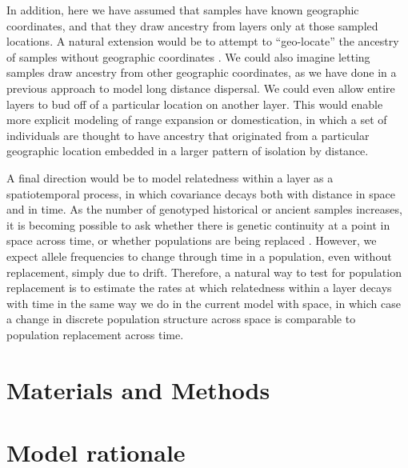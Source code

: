 \documentclass[10pt,letterpaper]{article}
\begin{document}
In addition, here we have assumed that samples have known geographic coordinates, 
and that they draw ancestry from layers only at those sampled locations. 
A natural extension would be to attempt to ``geo-locate'' 
the ancestry of samples without geographic coordinates \cite{Wasser2004}. 
We could also imagine letting samples draw ancestry from other geographic coordinates, 
as we have done in a previous approach \cite{spacemix} to model long distance dispersal. 
We could even allow entire layers to bud off of a particular location on another layer. 
This would enable more explicit modeling of range expansion or domestication, 
in which a set of individuals are thought to have ancestry that originated from
a particular geographic location embedded in a larger pattern of isolation by distance.

A final direction would be to model relatedness within a layer as a spatiotemporal process, 
in which covariance decays both with distance in space and in time.  
As the number of genotyped historical or ancient samples increases, 
it is becoming possible to ask whether there is genetic continuity at a point in space across time, 
or whether populations are being replaced \cite{lazaridis_ancient_2014, Haak2015, slatkin_racimo2016, Nielsen2017, Schraiber2017}.
However, we expect allele frequencies to change through time in a population, 
even without replacement, simply due to drift.
Therefore, a natural way to test for population replacement is to estimate the rates 
at which relatedness within a layer decays with time in the same way we do in the current model with space, 
in which case a change in discrete population structure across space is comparable to population replacement across time.

\section*{Materials and Methods}



\section*{Model rationale} \label{rationale}
\end{document}
